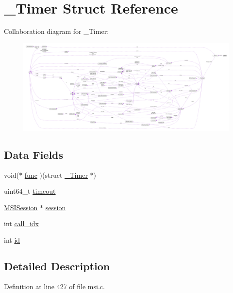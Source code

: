 \hypertarget{struct___timer}{\section{\+\_\+\+Timer Struct Reference}
\label{struct___timer}
}


Collaboration diagram for \+\_\+\+Timer\+:
\nopagebreak
\begin{figure}[H]
\begin{center}
\leavevmode
\includegraphics[width=350pt]{d4/dbe/struct___timer__coll__graph}
\end{center}
\end{figure}
\subsection*{Data Fields}
\begin{DoxyCompactItemize}
\item 
void($\ast$ \hyperlink{struct___timer_a7b75ecf42c49a289b6dd4fefdbf86605}{func} )(struct \hyperlink{struct___timer}{\+\_\+\+Timer} $\ast$)
\item 
uint64\+\_\+t \hyperlink{struct___timer_a053cdea1d85795444fe1aaa6b277a0ec}{timeout}
\item 
\hyperlink{msi_8h_adc69aa9b8f2f21b2b54e542cc9bb4329}{M\+S\+I\+Session} $\ast$ \hyperlink{struct___timer_affcb6f96b80aecebae0f1b157c6242b5}{session}
\item 
int \hyperlink{struct___timer_a1137c8c8a662d51868eda69bd73915d0}{call\+\_\+idx}
\item 
int \hyperlink{struct___timer_a7441ef0865bcb3db9b8064dd7375c1ea}{id}
\end{DoxyCompactItemize}


\subsection{Detailed Description}


Definition at line 427 of file msi.\+c.



